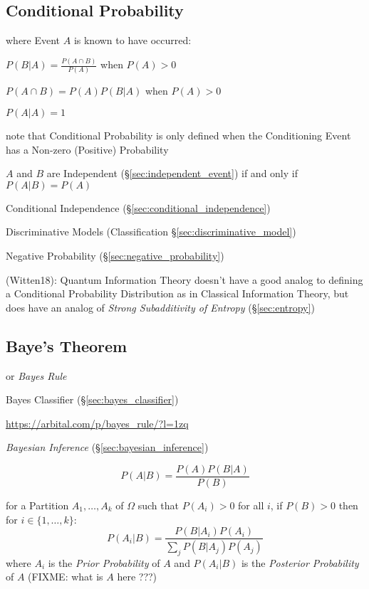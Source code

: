 \subsection{Conditional Probability}\label{sec:conditional_probability}

where Event $A$ is known to have occurred:

$P(B|A) = \frac{P(A \cap B)}{P(A)}$ when $P(A) > 0$

$P(A \cap B) = P(A) P(B|A)$ when $P(A) > 0$

$P(A|A) = 1$

note that Conditional Probability is only defined when the Conditioning Event
has a Non-zero (Positive) Probability

$A$ and $B$ are Independent (\S\ref{sec:independent_event}) if and only if
$P(A|B) = P(A)$

\fist Conditional Independence (\S\ref{sec:conditional_independence})

\fist Discriminative Models (Classification \S\ref{sec:discriminative_model})

\fist Negative Probability (\S\ref{sec:negative_probability})

(Witten18): Quantum Information Theory doesn't have a good analog to defining a
Conditional Probability Distribution as in Classical Information Theory, but
does have an analog of \emph{Strong Subadditivity of Entropy}
(\S\ref{sec:entropy})



\subsection{Baye's Theorem}\label{sec:bayes_theorem}

or \emph{Bayes Rule}

\fist Bayes Classifier (\S\ref{sec:bayes_classifier})

\url{https://arbital.com/p/bayes_rule/?l=1zq}

\emph{Bayesian Inference} (\S\ref{sec:bayesian_inference})

\[
  P(A|B) = \frac{P(A)P(B|A)}{P(B)}
\]

for a Partition $A_1, \ldots, A_k$ of $\Omega$ such that $P(A_i) > 0$ for all
$i$, if $P(B) > 0$ then for $i \in \{1, \ldots, k\}$:
\[
  P(A_i|B) = \frac{
    P(B|A_i)P(A_i)
  }{
    \sum_j P(B|A_j)P(A_j)
  }
\]
where $A_i$ is the \emph{Prior Probability} of $A$ and $P(A_i|B)$ is the
\emph{Posterior Probability} of $A$ (FIXME: what is $A$ here ???)

